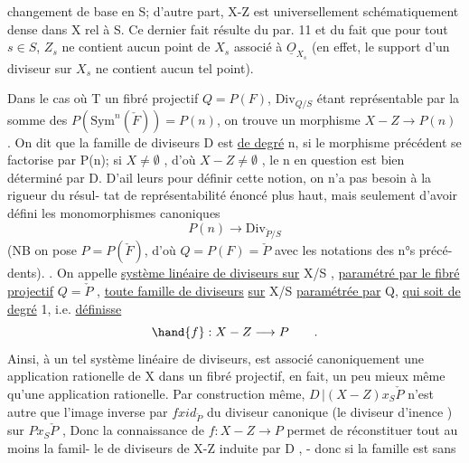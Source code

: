 changement de base en S; d'autre part, X-Z  est universellement
schématiquement dense dans X rel à S. Ce dernier fait résulte du 
 par. 11 et du fait que pour tout $s \in S$,
$Z_s$ ne contient aucun point de $X_s$ associé à $\underline{O}_{X_s}$ (en effet, le support d'un
diviseur  sur $X_s$ ne contient aucun tel point).

Dans le cas où T  un fibré projectif $Q=P(F)$, $\mathrm{Div}_{Q/S}$
étant représentable par la somme des $P(\mathrm{Sym}^n(\check{F})) = P(n)$, on trouve
un morphisme $X-Z \longrightarrow P(n)$ . On dit que la famille de diviseurs
D est \uline{de degré} n, si le morphisme précédent se factorise par P(n); si
$X \neq \emptyset$ , d'où $X-Z \neq \emptyset$ , le n en question est bien déterminé par D. D'ail%
leurs pour définir cette notion, on n'a pas besoin à la rigueur du résul-%
tat de représentabilité énoncé plus haut, mais seulement d'avoir défini
les monomorphismes canoniques
\[ P(n) \longrightarrow \mathrm{Div}_{\check{P}/S} \]
(NB on pose $P = P(\check{F})$, d'où $Q = P(F) = \check{P}$ avec les notations des n°s précé-%
dents). . On appelle \uline{système linéaire de diviseurs sur} X/S , \uline{paramétré
par le fibré projectif} $Q = \check{P}$ , \uline{toute famille de diviseurs} \uline{sur} X/S
\uline{paramétrée par} Q, \uline{qui soit de degré} 1, i.e. \uline{définisse}
\[ \hand{f} : X-Z \longrightarrow P \qquad . \]
Ainsi, à un tel système  linéaire de diviseurs, est associé canoniquement
une application rationelle de X dans un fibré projectif, \hand{(}en fait, un peu
mieux même qu'une application rationelle\hand{)}. Par construction même,
$D\,|(X-Z)x_S\check{P}$ n'est autre que l'image inverse par $f x id_{\check{P}}$ du diviseur
canonique (le diviseur d'inence ) sur $Px_S\check{P}$ , Donc la connaissance
de $f: X-Z \longrightarrow P$ permet de réconstituer  tout au moins la famil-%
le de diviseurs de X-Z induite par D , - donc si la famille est sans
